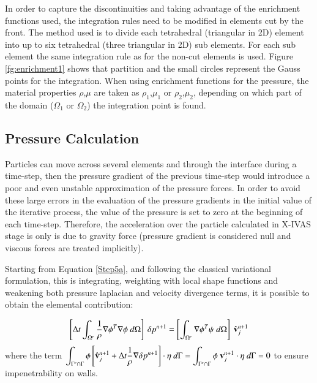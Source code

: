 In order to capture the discontinuities and taking advantage of the enrichment functions used, the integration rules need to be modified in elements cut by the front. The method used is to divide each tetrahedral (triangular in 2D) element into up to six tetrahedral
(three triangular in 2D) sub elements. For each sub element the same integration rule as for the non-cut elements is used. Figure \ref{fg:enrichment1} shows that partition and the small circles represent the Gauss points for the integration. When using enrichment functions for the pressure, the material properties $\rho$,$\mu$ are taken as $\rho_1$,$\mu_1$ or $\rho_2$,$\mu_2$, depending on which part of the domain ($\Omega_1$ or $\Omega_2$) the integration point is found.

   \subsection{Pressure Calculation}

Particles can move across several elements and through the interface during a time-step, then the pressure gradient of the previous time-step would introduce a poor and even unstable approximation of the pressure forces. In order to avoid these large errors in the evaluation of the pressure gradients in the initial value of the iterative process, the value of the pressure is set to zero at the beginning of each time-step. Therefore, the acceleration over the particle calculated in X-IVAS stage is only is due to gravity force (pressure gradient is considered null and viscous forces are treated implicitly)\cite{Idelsohn13c}.

Starting from Equation \ref{Step5a}, and following the classical variational formulation, this is integrating, weighting with local shape functions and weakening both pressure laplacian and velocity divergence terms, it is possible to obtain the elemental contribution:

\begin{equation}
   \left[\Delta t \int_{\Omega^e} \frac{1}{\rho} \nabla \phi^T \nabla \phi \ d\Omega\right]\ \delta p^{n+1} = \left[\int_{\Omega^e} \nabla \phi^T \psi \ d\Omega\right]\ \hat \vv_j^{n+1}
\label{poisson}
\end{equation}
where the term $\displaystyle \int_{\Gamma^e\cap\Gamma} \phi \left[ \hat \vv_j^{n+1} + \Delta t \frac{1}{\rho} \nabla  \delta p^{n+1} \right] \cdot \eta \ d\Gamma = \int_{\Gamma^e\cap\Gamma} \phi \ \vv_j^{n+1} \cdot \eta \ d\Gamma = 0$ to ensure impenetrability on walls. 

